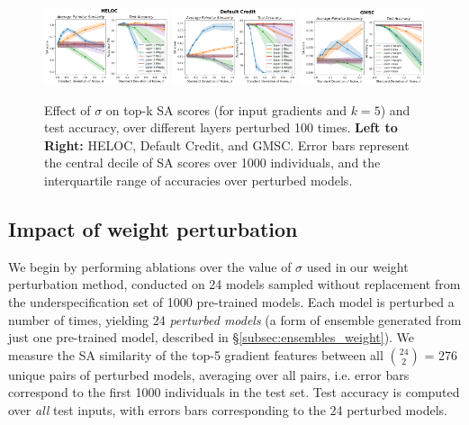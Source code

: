\begin{figure}[t]
    \centering
    \includegraphics[width=0.325\textwidth]{figures/perturb_heloc_layers.png}
    \includegraphics[width=0.325\textwidth]{figures/perturb_default_layers.png}
    \includegraphics[width=0.325\textwidth]{figures/perturb_gmsc_layers.png}
    \caption{\small Effect of $\sigma$ on top-k SA scores (for input gradients and $k=5$) and test accuracy, over different layers perturbed 100 times. \textbf{Left to Right:} HELOC, Default Credit, and GMSC. Error bars represent the central decile of SA scores over 1000 individuals, and the interquartile range of accuracies over perturbed models.}
    \label{fig:perturb}
\end{figure}



\subsection{Impact of weight perturbation}
\label{subsec:experiments_weight}

We begin by performing ablations over the value of $\sigma$ used in our weight perturbation method, conducted on 24 models sampled without replacement from the underspecification set of 1000 pre-trained models. Each model is perturbed a number of times, yielding 24 \textit{perturbed models} (a form of ensemble generated from just one pre-trained model, described in \S\ref{subsec:ensembles_weight}). We measure the SA similarity of the top-5 gradient features between all $\binom{24}{2}$ = 276 unique pairs of perturbed models, averaging over all pairs, i.e. error bars correspond to the first 1000 individuals in the test set. Test accuracy is computed over \textit{all} test inputs, with errors bars corresponding to the 24 perturbed models.

